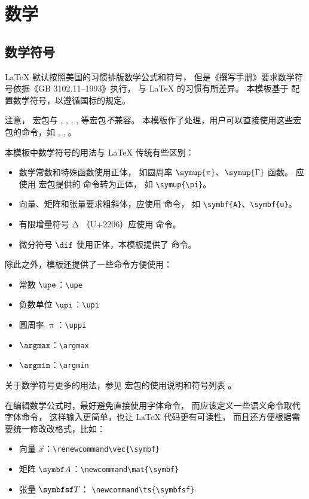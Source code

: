 
\chapter{数学}

\section{数学符号}

\LaTeX{} 默认按照美国的习惯排版数学公式和符号，
但是《撰写手册》要求数学符号依据《GB 3102.11--1993》执行，
与 \LaTeX{} 的习惯有所差异。
本模板基于  配置数学符号，以遵循国标的规定。

注意， 宏包与 , , ,
,  等宏包\emph{不}兼容。
本模板作了处理，用户可以直接使用这些宏包的命令，如 , ,
。

本模板中数学符号的用法与 \LaTeX{} 传统有些区别：
\begin{itemize}
  \item 数学常数和特殊函数使用正体，
    如圆周率 $\symup{\pi}$、$\symup{\Gamma}$ 函数。
    应使用  宏包提供的  命令转为正体，
    如 \verb|\symup{\pi}|。
  \item 向量、矩阵和张量要求粗斜体，应使用  命令，
    如 \verb|\symbf{A}|、\verb|\symbf{u}|。
  \item 有限增量符号 $\increment$ （U+2206）应使用  命令。
  \item 微分符号 $\dif$ 使用正体，本模板提供了  命令。
\end{itemize}

除此之外，模板还提供了一些命令方便使用：
\begin{itemize}
  \item 常数 $\upe$：\verb|\upe|
  \item 负数单位 $\upi$：\verb|\upi|
  \item 圆周率 $\uppi$：\verb|\uppi|
  \item $\argmax$：\verb|\argmax|
  \item $\argmin$：\verb|\argmin|
\end{itemize}

关于数学符号更多的用法，参见  宏包的使用说明和符号列表
。

在编辑数学公式时，最好避免直接使用字体命令，
而应该定义一些语义命令取代字体命令，
这样输入更简单，也让 \LaTeX{} 代码更有可读性，
而且还方便根据需要统一修改改格式，比如：
\begin{itemize}
  \item 向量 $\vec{x}$：\verb|\renewcommand\vec{\symbf}|
  \item 矩阵 $\mat{A}$：\verb|\newcommand\mat{\symbf}|
  \item 张量 $\ts{T}$： \verb|\newcommand\ts{\symbfsf}|
\end{itemize}

